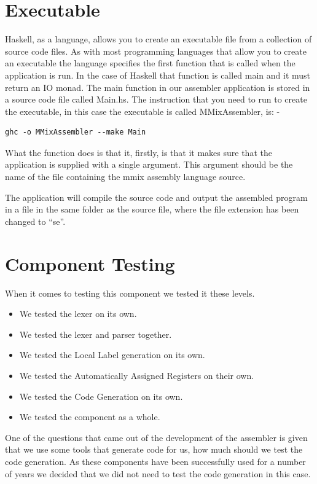\documentclass[a4paper,11pt]{report}
\begin{document}
\section{Executable}
Haskell, as a language, allows you to create an executable file from a collection of source code files. As with most programming languages that allow you to create an executable the language specifies the first function that is called when the application is run. In the case of Haskell that function is called main and it must return an IO monad.
\clearpage
The main function in our assembler application is stored in a source code file called Main.hs. The instruction that you need to run to create the executable, in this case the executable is called MMixAssembler, is: -

\begin{lstlisting}
ghc -o MMixAssembler --make Main
\end{lstlisting}

What the function does is that it, firstly, is that it makes sure that the application is supplied with a single argument. This argument should be the name of the file containing the mmix assembly language source.

The application will compile the source code and output the assembled program in a file in the same folder as the source file, where the file extension has been changed to ``se''.
\section{Component Testing}
When it comes to testing this component we tested it these levels.
\begin{itemize}
\item We tested the lexer on its own.
\item We tested the lexer and parser together.
\item We tested the Local Label generation on its own.
\item We tested the Automatically Assigned Registers on their own.
\item We tested the Code Generation on its own.
\item We tested the component as a whole.
\end{itemize}

One of the questions that came out of the development of the assembler is given that we use some tools that generate code for us, how much should we test the code generation. As these components have been successfully used for a number of years we decided that we did not need to test the code generation in this case.
\end{document}
